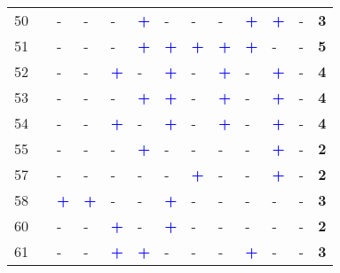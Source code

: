 \begin{longtable}{p{0.5cm}p{4.6cm}p{0.3cm}p{0.3cm}p{0.3cm}p{0.3cm}p{0.3cm}p{0.3cm}p{0.3cm}p{0.3cm}p{0.3cm}p{0.3cm}p{1cm}}
    \small{50} & \small{\textcite{fan_dockless_2020}}\index{Fan, Yichun|pagebf} & - & - & - & \textcolor{blue}{\textbf{+}} & - & - & - & \textcolor{blue}{\textbf{+}} & \textcolor{blue}{\textbf{+}} & - & \textbf{3}\\
    \small{51} & \small{\textcite{fearnley_patterns_2020}}\index{Fearnley, Nils|pagebf} & - & - & - & \textcolor{blue}{\textbf{+}} & \textcolor{blue}{\textbf{+}} & \textcolor{blue}{\textbf{+}} & \textcolor{blue}{\textbf{+}} & \textcolor{blue}{\textbf{+}} & - & - & \textbf{5}\\
    \small{52} & \small{\textcite{fillone_i_2018}}\index{Fillone, Alexis|pagebf} & - & - & \textcolor{blue}{\textbf{+}} & - & \textcolor{blue}{\textbf{+}} & - & \textcolor{blue}{\textbf{+}} & - & \textcolor{blue}{\textbf{+}} & - & \textbf{4}\\
    \small{53} & \small{\textcite{flamm_determinants_2013}}\index{Flamm, Bradley J.|pagebf} & - & - & - & \textcolor{blue}{\textbf{+}} & \textcolor{blue}{\textbf{+}} & - & \textcolor{blue}{\textbf{+}} & - & \textcolor{blue}{\textbf{+}} & - & \textbf{4}\\
    \small{54} & \small{\textcite{flamm_public_2014}}\index{Flamm, Bradley J.|pagebf} & - & - & \textcolor{blue}{\textbf{+}} & - & \textcolor{blue}{\textbf{+}} & - & \textcolor{blue}{\textbf{+}} & - & \textcolor{blue}{\textbf{+}} & - & \textbf{4}\\
    \small{55} & \small{\textcite{flamm_changes_2014}}\index{Flamm, Bradley J.|pagebf} & - & - & - & \textcolor{blue}{\textbf{+}} & - & - & - & - & \textcolor{blue}{\textbf{+}} & - & \textbf{2}\\
    \small{57} & \small{\textcite{fournier_continuous_2021}}\index{Fournier, Nicholas|pagebf} & - & - & - & - & - & \textcolor{blue}{\textbf{+}} & - & - & \textcolor{blue}{\textbf{+}} & - & \textbf{2}\\
    \small{58} & \small{\textcite{gan_associations_2021}}\index{Gan, Zuoxian|pagebf} & \textcolor{blue}{\textbf{+}} & \textcolor{blue}{\textbf{+}} & - & - & \textcolor{blue}{\textbf{+}} & - & - & - & - & - & \textbf{3}\\
    \small{60} & \small{\textcite{garcia-bello_methodological_2019}}\index{Marques, R.|pagebf} & - & - & \textcolor{blue}{\textbf{+}} & - & \textcolor{blue}{\textbf{+}} & - & - & - & - & - & \textbf{2}\\
    \small{61} & \small{\textcite{geurs_multi-modal_2016}}\index{Geurs, Karst T.|pagebf} & - & - & \textcolor{blue}{\textbf{+}} & \textcolor{blue}{\textbf{+}} & - & - & - & \textcolor{blue}{\textbf{+}} & - & - & \textbf{3}\\

\end{longtable}
